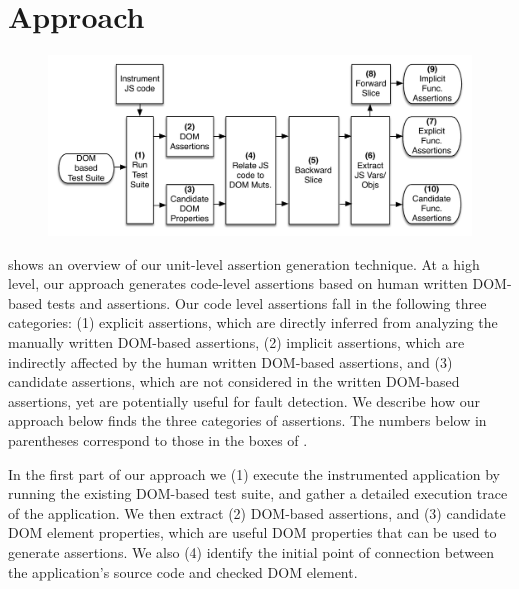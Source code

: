 \section{Approach} \label{Sec:approach}
\begin{figure}[!t]
  \centering
  \includegraphics[width=1\hsize]{fig/approachDiagram}
  \label{Fig:approachDiagram}
\end{figure}

 shows an overview of our unit-level assertion generation technique.
At a high level, our approach generates code-level assertions based on human written DOM-based tests and assertions. Our code level assertions fall in the following three categories: (1) explicit assertions, which are directly inferred from analyzing the manually written DOM-based assertions, (2) implicit assertions, which are indirectly affected by the human written DOM-based assertions, and (3) candidate assertions, which are not considered in the written DOM-based assertions, yet are potentially useful for fault detection. We describe how our approach below finds the three categories of assertions. The numbers below in parentheses correspond to those in the boxes of .

In the first part of our approach we (1) execute the instrumented application by running the existing DOM-based test suite, and gather a detailed execution trace of the application. We then extract (2) DOM-based assertions, and (3) candidate DOM element properties, which are useful DOM properties that can be used to generate assertions. We also (4) identify the initial point of connection between the application's source code and checked DOM element. 

